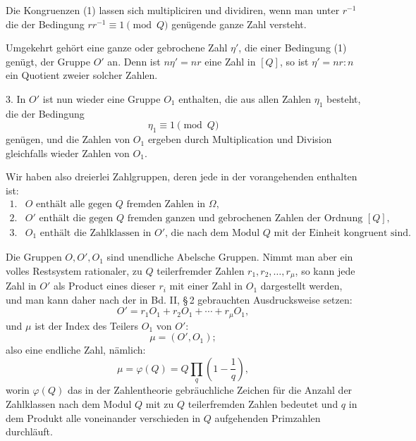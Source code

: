\documentclass[11pt]{article}
\begin{document}
Die Kongruenzen (1) lassen sich multipliciren und dividiren, wenn man unter $r^{-1}$ die der Bedingung $rr^{-1}\equiv1\pmod Q$ genügende ganze Zahl versteht.

Umgekehrt gehört eine ganze oder gebrochene Zahl $\eta'$, die einer Bedingung (1) genügt, der Gruppe $O'$ an. Denn ist $n\eta'=nr$ eine Zahl in $[Q]$, so ist $\eta'=nr:n$ ein Quotient zweier solcher Zahlen.

3. In $O'$ ist nun wieder eine Gruppe $O_1$ enthalten, die aus allen Zahlen $\eta_1$ besteht, die der Bedingung
\begin{equation}
 \eta_1\equiv1\pmod Q
\tag{2}
\end{equation}
genügen, und die Zahlen von $O_1$ ergeben durch Multiplication und Division gleichfalls wieder Zahlen von $O_1$.

Wir haben also dreierlei Zahlgruppen, deren jede in der vorangehenden enthalten ist:
\[
\begin{array}{ll}
1.& O \text{ enthält alle gegen }Q\text{ fremden Zahlen in }\Omega,\\
2.& O' \text{ enthält die gegen }Q\text{ fremden ganzen und gebrochenen Zahlen der Ordnung }[Q],\\
3.& O_1 \text{ enthält die Zahlklassen in }O'\text{, die nach dem Modul }Q\text{ mit der Einheit kongruent sind.}
\end{array}
\]

Die Gruppen $O,O',O_1$ sind unendliche Abelsche Gruppen. Nimmt man aber ein volles Restsystem rationaler, zu $Q$ teilerfremder Zahlen $r_1,r_2,\ldots,r_\mu$, so kann jede Zahl in $O'$ als Product eines dieser $r_i$ mit einer Zahl in $O_1$ dargestellt werden, und man kann daher nach der in Bd. II, \S\,2 gebrauchten Ausdrucksweise setzen:
\begin{equation}
 O'=r_1O_1+r_2O_1+\cdots+r_\mu O_1,
\tag{3}
\end{equation}
und $\mu$ ist der Index des Teilers $O_1$ von $O'$:
\begin{equation}
 \mu=(O',O_1);
\tag{4}
\end{equation}
also eine endliche Zahl, nämlich:
\begin{equation}
 \mu=\varphi(Q)=Q\prod_q\left(1-\frac1q\right),
\tag{5}
\end{equation}
worin $\varphi(Q)$ das in der Zahlentheorie gebräuchliche Zeichen für die Anzahl der Zahlklassen nach dem Modul $Q$ mit zu $Q$ teilerfremden Zahlen bedeutet und $q$ in dem Produkt alle voneinander verschieden in $Q$ aufgehenden Primzahlen durchläuft.
\end{document}
